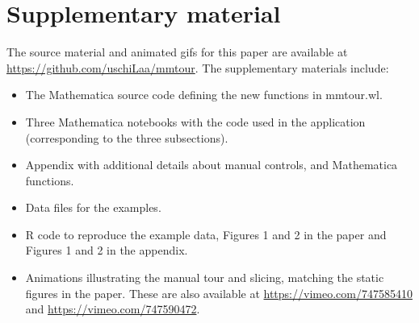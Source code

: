 \documentclass[]{interact}
\theoremstyle{plain}%
\theoremstyle{definition}
\theoremstyle{remark}
\providecommand{\tightlist}{%
  \setlength{\itemsep}{0pt}\setlength{\parskip}{0pt}}
\def\tightlist{}
\begin{document}
\hypertarget{supplementary-material}{%
\section*{Supplementary material}\label{supplementary-material}}

The source material and animated gifs for this paper are available at
\url{https://github.com/uschiLaa/mmtour}. The supplementary materials
include:

\begin{itemize}
\tightlist
\item
  The Mathematica source code defining the new functions in mmtour.wl.
\item
  Three Mathematica notebooks with the code used in the application
  (corresponding to the three subsections).
\item
  Appendix with additional details about manual controls, and
  Mathematica functions.
\item
  Data files for the examples.
\item
  R code to reproduce the example data, Figures 1 and 2 in the paper and
  Figures 1 and 2 in the appendix.
\item
  Animations illustrating the manual tour and slicing, matching the
  static figures in the paper. These are also available at
  \url{https://vimeo.com/747585410} and
  \url{https://vimeo.com/747590472}.
\end{itemize}



\end{document}
